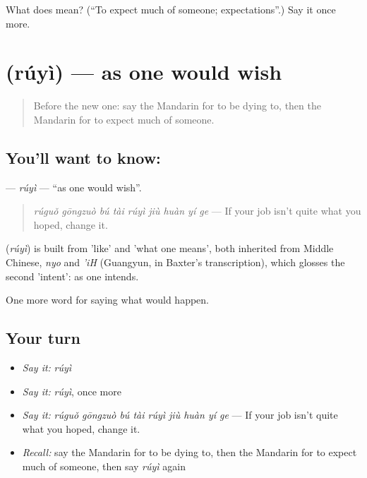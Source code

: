 \begin{tcolorbox}[breakable,colback=teal!4,colframe=teal!35!black,title={Before you move on}]
What does  mean? (\textquotedblleft{}To expect much of someone; expectations\textquotedblright{}.) Say it once more.
\end{tcolorbox}
\section[\texorpdfstring{\zh{如意} (rúyì)}{如意 (rúyì)}]{ (rúyì) — as one would wish}

\label{lesson:ZH-C532-ruyi}



\begin{quote}
Before the new one: say the Mandarin for to be dying to, then the Mandarin for to expect much of someone.
\end{quote}

\subsection*{You'll want to know: }
\textbf{} — \emph{rúyì} — \textquotedblleft{}as one would wish\textquotedblright{}.

\begin{quote}
\emph{rúguǒ gōngzuò bú tài rúyì jiù huàn yí ge} — If your job isn't quite what you hoped, change it.
\end{quote}

\begin{cousinweb}
\textbf{} (\emph{rúyì}) is built from  'like' and  'what one means', both inherited from Middle Chinese, \emph{nyo} and \emph{'iH} (Guangyun, in Baxter's transcription), which glosses the second 'intent': as one intends.
\end{cousinweb}

\begin{grammarlens}[title={What you've built}]
One more word for saying what would happen.
\end{grammarlens}

\subsection*{Your turn}
\begin{itemize}
\raggedright
  \item \emph{Say it:} \emph{rúyì}
  \item \emph{Say it:} \emph{rúyì}, once more
  \item \emph{Say it:} \emph{rúguǒ gōngzuò bú tài rúyì jiù huàn yí ge} — If your job isn't quite what you hoped, change it.
  \item \emph{Recall:} say the Mandarin for to be dying to, then the Mandarin for to expect much of someone, then say \emph{rúyì} again
\end{itemize}

